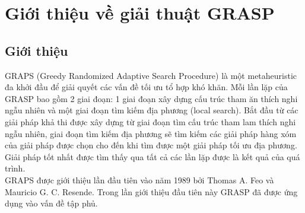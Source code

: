 \documentclass[14pt,a4paper]{report}
\begin{document}
\newcommand*\circled[1]{\tikz[baseline=(char.base)]{
  \node[shape=circle,draw,inner sep=2pt] (char) {#1};}}


\chapter{Giới thiệu về giải thuật GRASP}

\section{Giới thiệu}
GRAPS (Greedy Randomized Adaptive Search Procedure) là một metaheuristic đa khởi đầu để giải quyết các vấn đề tối ưu tổ hợp khó khăn. Mỗi lần lặp của GRASP bao gồm 2 giai đoạn: 1 giai đoạn xây dựng cấu trúc tham ăn thích nghi ngẫu nhiên và một giai đoạn tìm kiếm địa phương (local search). Bắt đầu từ các giải pháp khả thi được xây dựng từ giai đoạn tìm cấu trúc tham lam thích nghi ngẫu nhiên, giai đoạn tìm kiếm địa phương sẽ tìm kiếm các giải pháp hàng xóm của giải pháp được chọn cho đến khi tìm được một giải pháp tối ưu địa phương. Giải pháp tốt nhất được tìm thấy qua tất cả các lần lặp được là kết quả của quá trình.\\

GRAPS được giới thiệu lần đầu tiên vào năm 1989 bởi Thomas A. Feo và Mauricio G. C. Resende. Trong lần giới thiệu đầu tiên này GRASP đã được ứng dụng vào vấn đề tập phủ.\\
\end{document}
